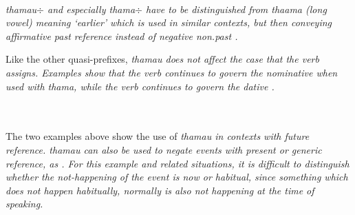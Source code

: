  \\
 

\em thamau$\div$ \em  and especially \em thama$\div$ \em have to be distinguished from \em thaama \em (long vowel) meaning `earlier' which is used in similar contexts, but then conveying affirmative past reference instead of negative non.past .

Like the other quasi-prefixes, \em thamau \em does not affect the case that the verb assigns. Examples  show that the verb  continues to govern the nominative when used with \em thama\em, while the verb  continues to govern the dative .


 \\

 
 \\

The two examples above  show the use of \em thamau \em in contexts with  future reference. \em thamau \em can also be used to negate events with present or generic reference, as . For this example and related situations, it is difficult to distinguish whether the not-happening of the event is now or habitual, since something which does not happen habitually, normally is also not happening at the time of speaking.

